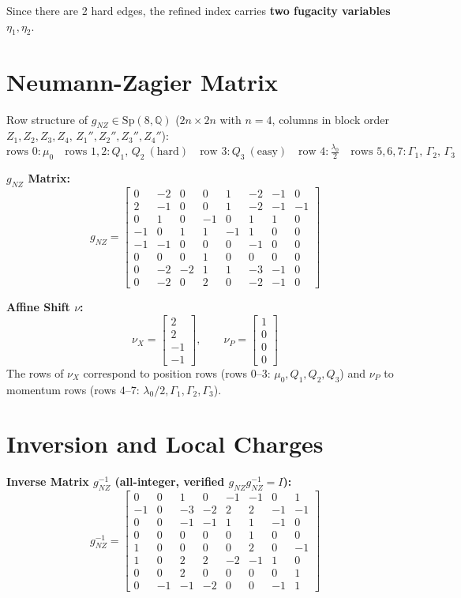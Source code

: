 \documentclass[12pt]{article}
\begin{document}
Since there are 2 hard edges, the refined index carries \textbf{two fugacity variables}
$\eta_1, \eta_2$.

\section{Neumann-Zagier Matrix}
Row structure of $g_{NZ} \in \mathrm{Sp}(8,\mathbb{Q})$
($2n \times 2n$ with $n=4$, columns in block order $Z_1, Z_2, Z_3, Z_4,\, Z_1'', Z_2'', Z_3'', Z_4''$):
\[
\text{rows } 0: \mu_0 \quad
\text{rows } 1,2: Q_1,\, Q_2\ (\text{hard}) \quad
\text{row } 3: Q_3\ (\text{easy}) \quad
\text{row } 4: \tfrac{\lambda_0}{2} \quad
\text{rows } 5,6,7: \Gamma_1,\, \Gamma_2,\, \Gamma_3
\]

\textbf{$g_{NZ}$ Matrix:}
\[ g_{NZ} = \begin{bmatrix}
 0 & -2 &  0 &  0 &  1 & -2 & -1 &  0 \\
 2 & -1 &  0 &  0 &  1 & -2 & -1 & -1 \\
 0 &  1 &  0 & -1 &  0 &  1 &  1 &  0 \\
-1 &  0 &  1 &  1 & -1 &  1 &  0 &  0 \\
-1 & -1 &  0 &  0 &  0 & -1 &  0 &  0 \\
 0 &  0 &  0 &  1 &  0 &  0 &  0 &  0 \\
 0 & -2 & -2 &  1 &  1 & -3 & -1 &  0 \\
 0 & -2 &  0 &  2 &  0 & -2 & -1 &  0
\end{bmatrix} \]

\textbf{Affine Shift $\nu$:}
\[
\nu_X = \begin{bmatrix} 2 \\ 2 \\ -1 \\ -1 \end{bmatrix}, \qquad
\nu_P = \begin{bmatrix} 1 \\ 0 \\ 0 \\ 0 \end{bmatrix}
\]
The rows of $\nu_X$ correspond to position rows (rows $0$--$3$: $\mu_0, Q_1, Q_2, Q_3$)
and $\nu_P$ to momentum rows (rows $4$--$7$: $\lambda_0/2, \Gamma_1, \Gamma_2, \Gamma_3$).

\section{Inversion and Local Charges}
\textbf{Inverse Matrix $g_{NZ}^{-1}$ (all-integer, verified $g_{NZ} g_{NZ}^{-1} = I$):}
\[ g_{NZ}^{-1} = \begin{bmatrix}
 0 &  0 &  1 &  0 & -1 & -1 &  0 &  1 \\
-1 &  0 & -3 & -2 &  2 &  2 & -1 & -1 \\
 0 &  0 & -1 & -1 &  1 &  1 & -1 &  0 \\
 0 &  0 &  0 &  0 &  0 &  1 &  0 &  0 \\
 1 &  0 &  0 &  0 &  0 &  2 &  0 & -1 \\
 1 &  0 &  2 &  2 & -2 & -1 &  1 &  0 \\
 0 &  0 &  2 &  0 &  0 &  0 &  0 &  1 \\
 0 & -1 & -1 & -2 &  0 &  0 & -1 &  1
\end{bmatrix} \]
\end{document}
